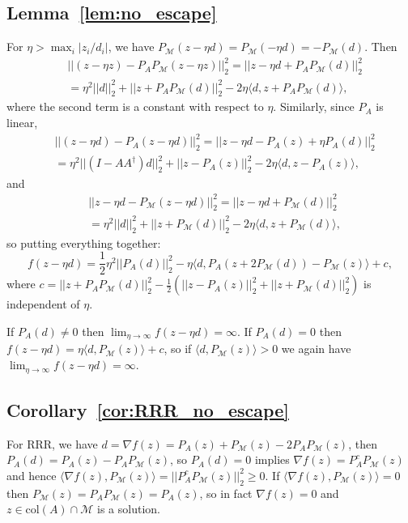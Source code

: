 \documentclass[12pt]{article}
\theoremstyle{definition}
\theoremstyle{remark}
\theoremstyle{definition}
\theoremstyle{problem}
\theoremstyle{definition}
\newcommand{\col}{\text{col}}
\newcommand{\MM}{\mathcal{M}}
\begin{document}
\subsection{Lemma~\ref{lem:no_escape}}\label{sec:pf_no_escape}
For $\eta>\max_i|z_i/d_i|$, we have $P_{\MM}(z-\eta d) = P_{\MM}(-\eta d) = -P_{\MM}(d)$. Then
\[\begin{aligned} &||(z-\eta z) - P_AP_{\MM}(z-\eta z)||_2^2 = ||z-\eta d + P_AP_{\MM}(d)||_2^2\\
&= \eta^2||d||_2^2 + ||z + P_AP_{\MM}(d)||_2^2 - 2\eta\langle d, z + P_AP_{\MM}(d)\rangle,\end{aligned}\]
where the second term is a constant with respect to $\eta$. Similarly, since $P_A$ is linear,
\[\begin{aligned} &||(z-\eta d) - P_A(z-\eta d)||_2^2 = ||z-\eta d - P_A(z) + \eta P_A(d)||_2^2\\
&= \eta^2||(I-AA^{\dagger})d||_2^2 + ||z-P_A(z)||_2^2 - 2\eta \langle d, z-P_A(z)\rangle,\end{aligned}\]
and
\[\begin{aligned} &||z-\eta d - P_{\MM}(z-\eta d)||_2^2 = ||z-\eta d + P_{\MM}(d)||_2^2\\
&= \eta^2||d||_2^2 + ||z+P_{\MM}(d)||_2^2 - 2\eta\langle d, z+P_{\MM}(d)\rangle,\end{aligned}\]
so putting everything together:
\[ f(z-\eta d) = \frac{1}{2}\eta^2 ||P_A(d)||_2^2 - \eta\langle d, P_A(z + 2P_{\MM}(d)) - P_{\MM}(z)\rangle + c,\]
where $c = ||z + P_AP_{\MM}(d)||_2^2 - \frac{1}{2}\left(||z-P_A(z)||_2^2 + ||z+P_{\MM}(d)||_2^2\right)$ is independent of $\eta$.

If $P_A(d)\neq 0$ then $\lim_{\eta\to\infty}f(z-\eta d)=\infty$. If $P_A(d) = 0$ then $f(z-\eta d) = \eta\langle d, P_{\MM}(z)\rangle + c$, so if $\langle d,P_{\MM}(z)\rangle > 0$ we again have $\lim_{\eta\to\infty}f(z-\eta d)=\infty$.

\subsection{Corollary~\ref{cor:RRR_no_escape}}\label{sec:pf_RRR_no_escape}
For RRR, we have $d=\nabla f(z) = P_A(z) + P_{\MM}(z) - 2P_AP_{\MM}(z)$, then $P_A(d) = P_A(z) - P_AP_{\MM}(z)$, so $P_A(d) = 0$ implies $\nabla f(z) = P_A^cP_{\MM}(z)$ and hence $\langle \nabla f(z), P_{\MM}(z)\rangle = ||P_A^cP_{\MM}(z)||_2^2 \geq 0$. If $\langle \nabla f(z), P_{\MM}(z)\rangle = 0$ then $P_{\MM}(z) = P_AP_{\MM}(z) = P_A(z)$, so in fact $\nabla f(z) = 0$ and $z\in\col(A)\cap\MM$ is a solution.
\end{document}
